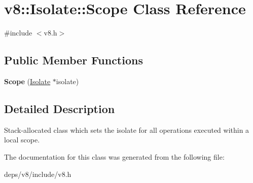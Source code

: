 \hypertarget{classv8_1_1_isolate_1_1_scope}{}\section{v8\+:\+:Isolate\+:\+:Scope Class Reference}
\label{classv8_1_1_isolate_1_1_scope}


{\ttfamily \#include $<$v8.\+h$>$}

\subsection*{Public Member Functions}
\begin{DoxyCompactItemize}
\item 
\hypertarget{classv8_1_1_isolate_1_1_scope_a43889336478a5625e095c4444b9dd684}{}{\bfseries Scope} (\hyperlink{classv8_1_1_isolate}{Isolate} $\ast$isolate)\label{classv8_1_1_isolate_1_1_scope_a43889336478a5625e095c4444b9dd684}

\end{DoxyCompactItemize}


\subsection{Detailed Description}
Stack-\/allocated class which sets the isolate for all operations executed within a local scope. 

The documentation for this class was generated from the following file\+:\begin{DoxyCompactItemize}
\item 
deps/v8/include/v8.\+h\end{DoxyCompactItemize}
